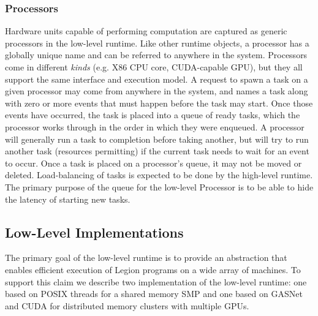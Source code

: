 \subsubsection{Processors}
\label{subsec:processors}
Hardware units capable of performing computation are captured as generic
processors in the low-level runtime.  Like other runtime objects, a processor
has a globally unique name and can be referred to anywhere in the system.
Processors come in different \emph{kinds} (e.g. X86 CPU core, CUDA-capable GPU),
but they all support the same
interface and execution model.  A request to spawn a task on a given processor
may come from anywhere in the system, and names a task along with zero or
more events that must happen before the task may start.  Once those
events have occurred, the task is placed into a queue of ready tasks, which
the processor works through in the order in which they were enqueued.  A
processor will generally run a task to completion before taking another, but
will try to run another task (resources permitting) if the current task needs
to wait for an event to occur.  Once a task is placed on a processor's queue,
it may not be moved or deleted.  Load-balancing of tasks is expected to be done
by the high-level runtime.  The primary purpose of the queue for the low-level
Processor is to be able to hide the latency of starting new tasks.


\subsection{Low-Level Implementations}
\label{subsec:lowimpl}
The primary goal of the low-level runtime is to provide an
abstraction that enables efficient execution of Legion programs
on a wide array of machines.  To support this claim we describe
two implementation of the low-level runtime: one based on POSIX
threads for a shared memory SMP and one based on GASNet \cite{GASNET07} 
and CUDA for distributed memory clusters with multiple GPUs.



